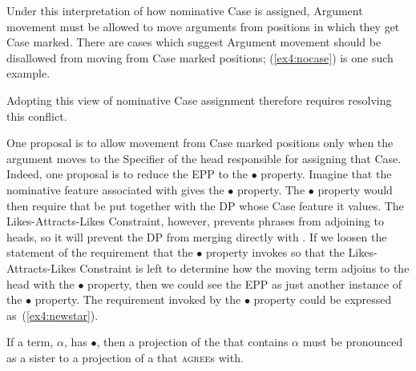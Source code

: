 Under this interpretation of how nominative Case is assigned, Argument movement must be allowed to move arguments from positions in which they get Case marked. There are cases which suggest Argument movement should be disallowed from moving from Case marked positions; (\ref{ex4:nocase}) is one such example.
\begin{exe}
\end{exe}
Adopting this view of nominative Case assignment therefore requires resolving this conflict.

One proposal is to allow movement from Case marked positions only when the argument moves to the Specifier of the head responsible for assigning that Case. Indeed, one proposal is to reduce the EPP to the $\bullet$ property. Imagine that the nominative feature associated with  gives  the $\bullet$ property. The $\bullet$ property would then require that  be put together with the DP whose Case feature it values. The Likes-Attracts-Likes Constraint, however, prevents phrases from adjoining to heads, so it will prevent the DP from merging directly with . If we loosen the statement of the requirement that the $\bullet$ property invokes so that the Likes-Attracts-Likes Constraint is left to determine how the moving term adjoins to the head with the $\bullet$ property, then we could see the EPP as just another instance of the $\bullet$ property. The requirement invoked by the $\bullet$ property could be expressed as~(\ref{ex4:newstar}).
\begin{exe}
\ex \label{ex4:newstar} If a term, $\alpha$, has $\bullet$, then a projection of the  that contains $\alpha$ must be pronounced as a sister to a projection of a  that  \textsc{agree}s with.
\end{exe}

